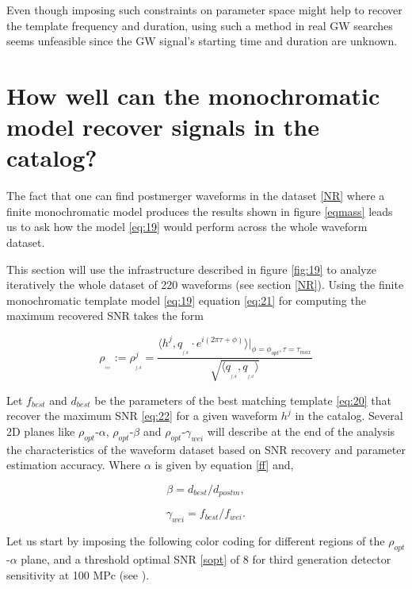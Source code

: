 Even though imposing such constraints on parameter space might help to recover the template frequency and duration, using such a method in real GW searches seems unfeasible since the GW signal's starting time and duration are unknown.

\newpage
\section{How well can the monochromatic model recover signals in the catalog?}\label{eori}

The fact that one can find postmerger waveforms in the dataset \ref{NR} where a finite monochromatic model produces the results shown in figure \ref{eqmass} leads us to ask how the model \ref{eq:19} would perform across the whole waveform dataset. 
 
This section will use the infrastructure described in figure \ref{fig:19} to analyze iteratively the whole dataset of 220 waveforms (see section \ref{NR}). Using the finite monochromatic template model \ref{eq:19} equation \ref{eq:21} for computing the maximum recovered SNR takes the form



\begin{equation}\label{eq:22}
\rho_{_{_{rec}}} := \rho^j_{_{_{f,d}}} = \frac{\langle h^j, q_{_{_{f,d}}}\cdot e^{i(2\pi \tau+\phi)}\rangle \bigg\rvert_{\phi =\phi_{opt},\tau =\tau_{max}}}{\sqrt{\langle  q_{_{_{f,d}}},q_{_{_{f,d}}} \rangle}}
\end{equation}


Let $f_{best}$ and $d_{best}$ be the parameters of the best matching template \ref{eq:20} that recover the maximum SNR \ref{eq:22}  for a given waveform $h^j$ in the catalog. Several 2D planes like $\rho_{opt}$-$\alpha$, $\rho_{opt}$-$\beta$ and $\rho_{opt}$-$\gamma_{wei}$ will describe at the end of the analysis the characteristics of the waveform dataset based on SNR recovery and parameter estimation accuracy. Where $\alpha$ is given by equation \ref{ff} and,

\begin{equation}
\beta=d_{best}/d_{postm},
\end{equation}

\begin{equation}
\gamma_{wei}=f_{best}/f_{wei}.
\end{equation}

Let us start by imposing the following color coding for different regions of the $\rho_{opt}$-$\alpha$ plane, and a threshold optimal SNR \ref{sopt} of 8 for third generation detector sensitivity at 100 MPc (see \cite{Maggiore_2020,https://doi.org/10.48550/arxiv.2109.09882}).


